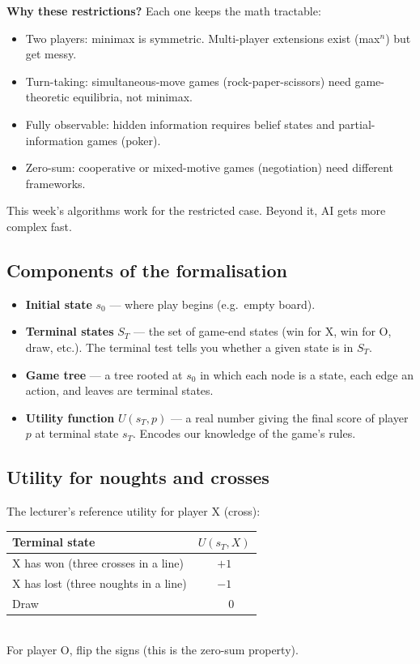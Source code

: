 \documentclass[11pt, a4paper]{article}
\newcommand{\thead}[1]{\textbf{#1}}
\begin{document}
\textbf{Why these restrictions?} Each one keeps the math tractable:

\begin{itemize}
  \item Two players: minimax is symmetric. Multi-player extensions exist (max$^n$) but get messy.
  \item Turn-taking: simultaneous-move games (rock-paper-scissors) need game-theoretic equilibria, not minimax.
  \item Fully observable: hidden information requires belief states and partial-information games (poker).
  \item Zero-sum: cooperative or mixed-motive games (negotiation) need different frameworks.
\end{itemize}

This week's algorithms work for the restricted case. Beyond it, AI gets more complex fast.

\subsection{Components of the formalisation}

\begin{itemize}
  \item \textbf{Initial state} $s_0$ — where play begins (e.g.\ empty board).
  \item \textbf{Terminal states} $S_T$ — the set of game-end states (win for X, win for O, draw, etc.). The terminal test tells you whether a given state is in $S_T$.
  \item \textbf{Game tree} — a tree rooted at $s_0$ in which each node is a state, each edge an action, and leaves are terminal states.
  \item \textbf{Utility function} $U(s_T, p)$ — a real number giving the final score of player $p$ at terminal state $s_T$. Encodes our knowledge of the game's rules.
\end{itemize}

\subsection{Utility for noughts and crosses}

The lecturer's reference utility for player X (cross):

\begin{exbox}
\begin{tabular}{@{}p{6cm}c@{}}
\toprule
\thead{Terminal state} & \thead{$U(s_T, X)$} \\
\midrule
X has won (three crosses in a line)        & $+1$ \\
X has lost (three noughts in a line)       & $-1$ \\
Draw                                       & $\phantom{+}0$ \\
\bottomrule
\end{tabular}\\[0.3em]
For player O, flip the signs (this is the zero-sum property).
\end{exbox}
\end{document}
